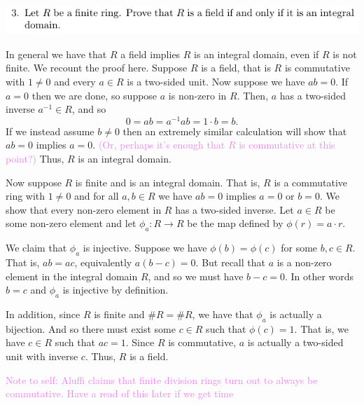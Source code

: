 \documentclass[12pt,letterpaper,boxed]{hmcpset}
\newcommand{\wg}[1]{\textcolor{violet}{#1}}
\newcommand{\inv}{^{-1}}
\begin{document}
\newpage


\begin{problem}
	\includegraphics[scale=0.8]{3.png}
	\hfill
\end{problem}
\begin{solution}
In general we have that $R$ a field implies $R$ is an integral domain,
even if $R$ is not finite. We recount the proof here.
Suppose $R$ is a field, that is $R$ is commutative with $1 \neq 0$ and
every $a \in R$ is a two-sided unit. Now suppose we have $ab = 0$.
If $a = 0$ then we are done, so suppose 
$a$ is non-zero in
$R$. Then, $a$ has a two-sided inverse $a\inv \in R$, and so \[
	0 = ab = a\inv a b = 1 \cdot b = b.
\]
If we instead assume $b \neq 0$ then 
an extremely similar calculation will show that $ab = 0$ implies $a =
0$. \wg{(Or, perhaps it's enough that $R$ is commutative at this
point?)} 
Thus, $R$ is an integral domain.

Now suppose $R$ is finite and is an integral domain. That is, $R$ is a
commutative ring with $1 \neq 0$ and for all $a,b \in R$ we have $ab =
0$ implies $a = 0$ or $b = 0$. We show that every non-zero element in
$R$ has a two-sided inverse.
Let $a \in R$ be some non-zero element and let $\phi_a: R \to R$ be
the map defined by $\phi(r) = a\cdot r$. 

We claim that $\phi_a$ is
injective. Suppose we have $\phi(b) = \phi(c)$ for some $b,c \in R$.
That is, $ab = ac$, equivalently $a(b-c)= 0$. But recall that $a$ is a
non-zero element in the integral domain $R$, and so we must have $b-c = 0$. In
other words $b = c$ and $\phi_a$ is injective by definition.

In addition, since $R$ is finite and $\# R = \# R$, we have that
$\phi_a$ is actually a bijection. And so there must exist some $c \in
R$ such that $\phi(c) = 1$. That is, we have $c \in R$ such that $a c
= 1$. Since $R$ is commutative, $a$ is actually a two-sided unit with
inverse $c$. Thus, $R$ is a field.

\wg{Note to self: Aluffi claims that finite division rings turn out to
always be commutative. Have a read of this later if we get time}
\end{solution}

\newpage

\end{document}
